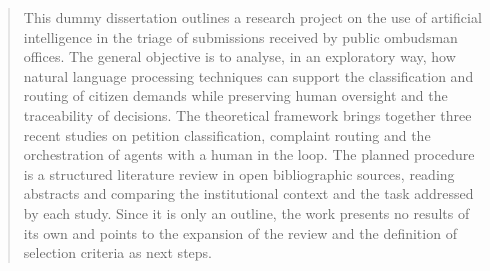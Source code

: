 \begin{abstract}
This dummy dissertation outlines a research project on the use of artificial intelligence in the triage of submissions received by public ombudsman offices. The general objective is to analyse, in an exploratory way, how natural language processing techniques can support the classification and routing of citizen demands while preserving human oversight and the traceability of decisions. The theoretical framework brings together three recent studies on petition classification, complaint routing and the orchestration of agents with a human in the loop. The planned procedure is a structured literature review in open bibliographic sources, reading abstracts and comparing the institutional context and the task addressed by each study. Since it is only an outline, the work presents no results of its own and points to the expansion of the review and the definition of selection criteria as next steps.
\end{abstract}
